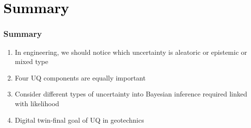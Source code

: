 \section{\textcolor{black}{Summary}}
\begin{frame}

\frametitle{Summary}

\begin{enumerate}
\setlength\itemsep{1em}
    \item In engineering, we should notice which uncertainty is \alert{aleatoric} or \alert{epistemic} or \alert{mixed type}
 
    \item Four UQ components are \alert{equally} important

    \item Consider different types of uncertainty into Bayesian inference required \alert{linked with likelihood}

    \item \alert{Digital twin}-final goal of UQ in geotechnics 
\end{enumerate}

    
\end{frame}





